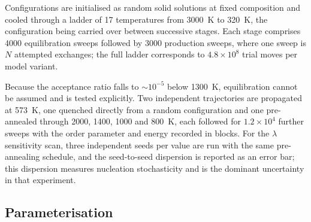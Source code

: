 \documentclass[11pt,a4paper]{article}
\begin{document}
Configurations are initialised as random solid solutions at fixed composition
and cooled through a ladder of 17 temperatures from 3000~K to 320~K, the
configuration being carried over between successive stages. Each stage comprises
4000 equilibration sweeps followed by 3000 production sweeps, where one sweep is
$N$ attempted exchanges; the full ladder corresponds to $4.8 \times 10^8$ trial
moves per model variant.

Because the acceptance ratio falls to $\sim 10^{-5}$ below 1300~K, equilibration
cannot be assumed and is tested explicitly. Two independent trajectories are
propagated at 573~K, one quenched directly from a random configuration and one
pre-annealed through 2000, 1400, 1000 and 800~K, each followed for
$1.2\times 10^4$ further sweeps with the order parameter and energy recorded in
blocks. For the $\lambda$ sensitivity scan, three independent seeds per value are
run with the same pre-annealing schedule, and the seed-to-seed dispersion is
reported as an error bar; this dispersion measures nucleation stochasticity and
is the dominant uncertainty in that experiment.

\subsection{Parameterisation}
\end{document}
